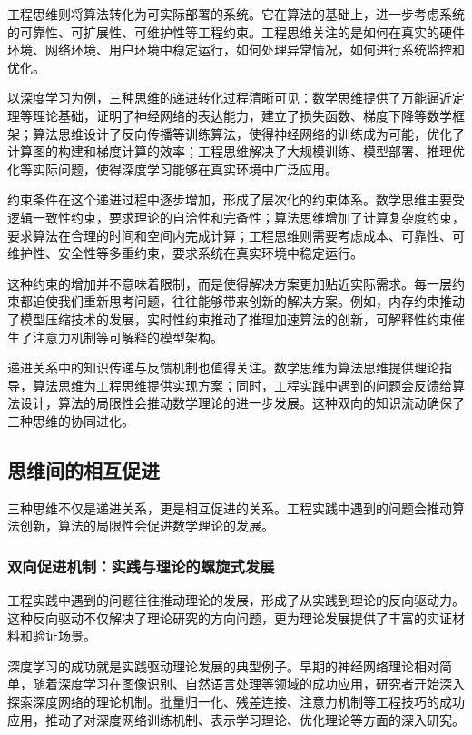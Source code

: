 工程思维则将算法转化为可实际部署的系统。它在算法的基础上，进一步考虑系统的可靠性、可扩展性、可维护性等工程约束。工程思维关注的是如何在真实的硬件环境、网络环境、用户环境中稳定运行，如何处理异常情况，如何进行系统监控和优化。

以深度学习为例，三种思维的递进转化过程清晰可见：数学思维提供了万能逼近定理等理论基础，证明了神经网络的表达能力，建立了损失函数、梯度下降等数学框架；算法思维设计了反向传播等训练算法，使得神经网络的训练成为可能，优化了计算图的构建和梯度计算的效率；工程思维解决了大规模训练、模型部署、推理优化等实际问题，使得深度学习能够在真实环境中广泛应用。

约束条件在这个递进过程中逐步增加，形成了层次化的约束体系。数学思维主要受逻辑一致性约束，要求理论的自洽性和完备性；算法思维增加了计算复杂度约束，要求算法在合理的时间和空间内完成计算；工程思维则需要考虑成本、可靠性、可维护性、安全性等多重约束，要求系统在真实环境中稳定运行。

这种约束的增加并不意味着限制，而是使得解决方案更加贴近实际需求。每一层约束都迫使我们重新思考问题，往往能够带来创新的解决方案。例如，内存约束推动了模型压缩技术的发展，实时性约束推动了推理加速算法的创新，可解释性约束催生了注意力机制等可解释的模型架构。

递进关系中的知识传递与反馈机制也值得关注。数学思维为算法思维提供理论指导，算法思维为工程思维提供实现方案；同时，工程实践中遇到的问题会反馈给算法设计，算法的局限性会推动数学理论的进一步发展。这种双向的知识流动确保了三种思维的协同进化。

\subsection{思维间的相互促进}

三种思维不仅是递进关系，更是相互促进的关系。工程实践中遇到的问题会推动算法创新，算法的局限性会促进数学理论的发展。

\subsubsection{双向促进机制：实践与理论的螺旋式发展}

工程实践中遇到的问题往往推动理论的发展，形成了从实践到理论的反向驱动力。这种反向驱动不仅解决了理论研究的方向问题，更为理论发展提供了丰富的实证材料和验证场景。

深度学习的成功就是实践驱动理论发展的典型例子。早期的神经网络理论相对简单，随着深度学习在图像识别、自然语言处理等领域的成功应用，研究者开始深入探索深度网络的理论机制。批量归一化、残差连接、注意力机制等工程技巧的成功应用，推动了对深度网络训练机制、表示学习理论、优化理论等方面的深入研究。

